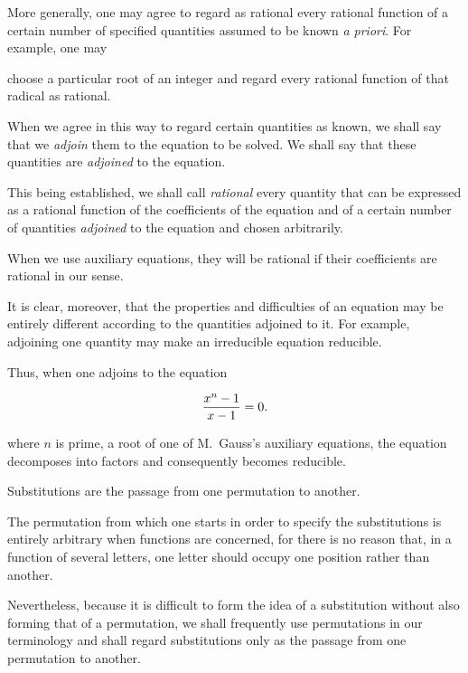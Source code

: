More generally, one may agree to regard as rational every rational function of
a certain number of specified quantities assumed to be known \emph{a priori}.
For example, one may


choose a particular root of an integer and regard every rational function of
that radical as rational.

When we agree in this way to regard certain quantities as known, we shall say
that we \emph{adjoin} them to the equation to be solved. We shall say that these
quantities are \emph{adjoined} to the equation.

This being established, we shall call \emph{rational} every quantity that can be
expressed as a rational function of the coefficients of the equation and of a
certain number of quantities \emph{adjoined} to the equation and chosen
arbitrarily.

When we use auxiliary equations, they will be rational if their coefficients
are rational in our sense.

It is clear, moreover, that the properties and difficulties of an equation may
be entirely different according to the quantities adjoined to it. For example,
adjoining one quantity may make an irreducible equation reducible.

Thus, when one adjoins to the equation

\[
\frac{x^{n}-1}{x-1}=0\GalControlReading{.}{W09-CD007}
\]

where $n$ is prime, a root of one of M.~Gauss's auxiliary equations, the
equation decomposes into factors and consequently becomes reducible.

Substitutions are the passage from one permutation to another.

The permutation from which one starts in order to specify the substitutions is
entirely arbitrary when functions are concerned, for there is no reason that,
in a function of several letters, one letter should occupy one position rather
than another.

Nevertheless, because it is difficult to form the idea of a substitution
without also forming that of a permutation, we shall frequently use
permutations in our terminology and shall regard substitutions only as the
passage from one permutation to another.

